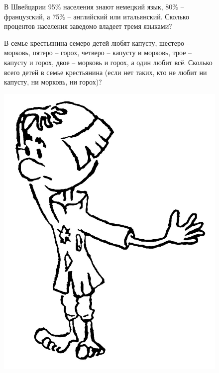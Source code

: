 {\setlength{\intextsep}{2pt}
\begin{figure}[h]
\begin{minipage}{0.85\linewidth}\setlength{\parindent}{1.5em}
    \begin{thm}
    В Швейцарии 95\% населения знают немецкий язык, 80\% – французский, а 75\% – английский или итальянский. Сколько процентов населения заведомо владеет тремя языками?
    \end{thm}

    \begin{thm}
    В семье крестьянина семеро детей любят капусту, шестеро – морковь, пятеро – горох, четверо – капусту и морковь, трое – капусту и горох, двое – морковь и горох, а один любит всё. Сколько всего детей в семье крестьянина (если нет таких, кто не любит ни капусту, ни морковь, ни горох)?
    \end{thm}
\end{minipage}
\hfill
\begin{minipage}{0.14\linewidth}
    \includegraphics[width=0.95\columnwidth]{img/krestyanin.png}
\end{minipage}
\end{figure}}

